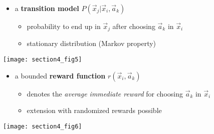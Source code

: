 \begin{minipage}{\textwidth}
		\begin{minipage}{7.75cm}
			\begin{itemize}
			\item a {\color{trans}\textbf{transition model} 
			$P(\vec x_j|\vec x_i, \vec a_k)$}
			\begin{itemize}
				\item probability to end up in $\vec x_j$ 
					after choosing $\vec a_k$ in $\vec x_i$
				\item stationary distribution (Markov property)
			\end{itemize}
			\end{itemize} 
		\end{minipage}
		\hfill
		\begin{minipage}{4cm}
			\begin{center}
				\texttt{[image: section4\_fig5]} \\
			\end{center}
		\end{minipage}
	\end{minipage}

\begin{minipage}{\textwidth}
		\begin{minipage}{7.75cm}
			\begin{itemize}
			\item a bounded {\color{reward}\textbf{reward function} 
			$r(\vec x_i, \vec a_k)$}
			\begin{itemize}
				\item denotes the {\em average immediate reward} 
					for choosing $\vec a_k$ in $\vec x_i$
				\item extension with randomized rewards possible
			\end{itemize}
			\end{itemize} 
		\end{minipage}
		\hfill
		\begin{minipage}{4cm}
			\begin{center}
				\texttt{[image: section4\_fig6]} \\
			\end{center}
		\end{minipage}
	\end{minipage}

